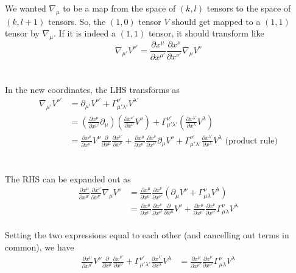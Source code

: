 \documentclass[11pt]{article}
\begin{document}
We wanted $\nabla_{\mu}$ to be a map from the space of $(k,l)$ tensors to the space of $(k, l+1)$ tensors. So, the $(1, 0)$ tensor $V$ should get mapped to a $(1,1)$ tensor by $\nabla_{\mu}$. If it is indeed a $(1,1)$ tensor, it should transform like
\[ \nabla_{\mu'} V^{\nu'} = \frac{\partial x^{\mu}}{\partial x^{\mu'}} \frac{\partial x^{\nu}}{\partial x^{\nu'}} \nabla_{\mu} V^{\nu} \]
\\
\\
In the new coordinates, the LHS transforms as 
\begin{align*}
  \nabla_{\mu'} V^{\nu'} &= \partial_{\mu'} V^{\nu'} + \Gamma_{\mu' \lambda'}^{\nu'} V^{\lambda'} \\
  &= \left(\frac{\partial x^{\mu}}{\partial x^{\mu'}} \partial_{\mu}\right) \left( \frac{\partial x^{\nu'}}{\partial x^{\nu}} V^{\nu} \right) + \Gamma_{\mu' \lambda'}^{\nu'} \left(\frac{\partial x^{\lambda'}}{\partial x^{\lambda}} V^{\lambda} \right)\\
  &= \frac{\partial x^{\mu}}{\partial x^{\mu'}} V^{\nu} \frac{\partial}{\partial x^{\mu}} \frac{\partial x^{\nu'}}{\partial x^{\nu}}  +  \frac{\partial x^{\mu}}{\partial x^{\mu'}} \frac{\partial x^{\nu}}{\partial x^{\nu'}} \partial_{\mu} V^{\nu} +  \Gamma_{\mu' \lambda'}^{\nu'} \frac{\partial x^{\lambda'}}{\partial x^{\lambda}} V^{\lambda} \text{ (product rule)}
\end{align*}
\\
\\
The RHS can be expanded out as 
\begin{align*}
  \frac{\partial x^{\mu}}{\partial x^{\mu'}} \frac{\partial x^{\nu}}{\partial x^{\nu'}} \nabla_{\mu} V^{\nu} &= \frac{\partial x^{\mu}}{\partial x^{\mu'}} \frac{\partial x^{\nu}}{\partial x^{\nu'}} \left( \partial_{\mu} V^{\nu} + \Gamma_{\mu \lambda}^{\nu} V^{\lambda} \right) \\
  &= \frac{\partial x^{\mu}}{\partial x^{\mu'}} \frac{\partial x^{\nu}}{\partial x^{\nu'}} \frac{\partial}{\partial x^{\mu}} V^{\nu} + \frac{\partial x^{\mu}}{\partial x^{\mu'}} \frac{\partial x^{\nu}}{\partial x^{\nu'}} \Gamma_{\mu \lambda}^{\nu} V^{\lambda}
\end{align*}
\\
Setting the two expressions equal to each other (and cancelling out terms in common), we have 
\begin{align*}
  \frac{\partial x^{\mu}}{\partial x^{\mu'}} V^{\nu} \frac{\partial}{\partial x^{\mu}} \frac{\partial x^{\nu'}}{\partial x^{\nu}} + \Gamma_{\mu' \lambda'}^{\nu'} \frac{\partial x^{\lambda'}}{\partial x^{\lambda}} V^{\lambda} &=  \frac{\partial x^{\mu}}{\partial x^{\mu'}} \frac{\partial x^{\nu}}{\partial x^{\nu'}} \Gamma_{\mu \lambda}^{\nu} V^{\lambda}
\end{align*}
\end{document}
